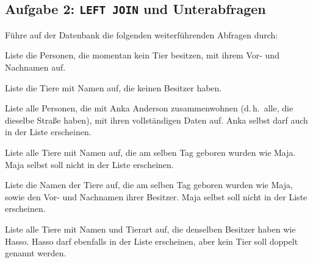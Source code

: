 \subsection{Aufgabe 2: \texttt{LEFT JOIN} und Unterabfragen}

Führe auf der Datenbank  die folgenden weiterführenden
Abfragen durch:

\begin{compactenum}[a)]
\item Liste die Personen, die momentan kein Tier besitzen, mit ihrem Vor- und
Nachnamen auf.
\item Liste die Tiere mit Namen auf, die keinen Besitzer haben.
\item Liste alle Personen, die mit Anka Anderson zusammenwohnen (d.\,h.\ alle,
die dieselbe Straße haben), mit ihren vollständigen Daten auf. Anka selbst
darf auch in der Liste erscheinen.
\item Liste alle Tiere mit Namen auf, die am selben Tag geboren wurden wie Maja.
Maja selbst soll nicht in der Liste erscheinen.
\item Liste die Namen der Tiere auf, die am selben Tag geboren wurden wie Maja,
sowie den Vor- und Nachnamen ihrer Besitzer. Maja selbst soll nicht in der
Liste erscheinen.
\item Liste alle Tiere mit Namen und Tierart auf, die denselben Besitzer haben
wie Hasso. Hasso darf ebenfalls in der Liste erscheinen, aber kein Tier soll
doppelt genannt werden.
\end{compactenum}